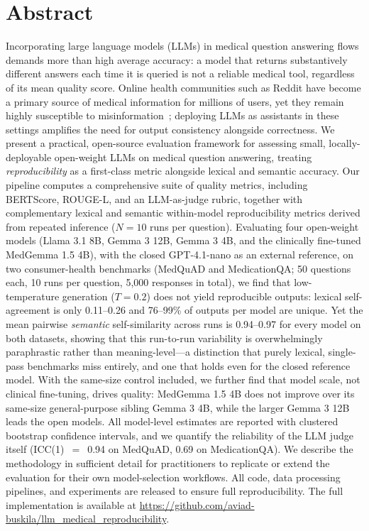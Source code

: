 \documentclass[10pt,letterpaper]{article}
\begin{document}
\section*{Abstract}
Incorporating large language models (LLMs) in medical question answering
flows demands more than high average accuracy: a model that returns
substantively different answers each time it is queried is not a reliable
medical tool, regardless of its mean quality score.
Online health communities such as Reddit have become a primary source of
medical information for millions of users, yet they remain highly
susceptible to misinformation~\cite{suarezlledo2021misinfo, sager2021reddit};
deploying LLMs as assistants in these settings amplifies the need for
output consistency alongside correctness.
We present a practical, open-source evaluation framework for
assessing small, locally-deployable open-weight LLMs on medical
question answering, treating \emph{reproducibility} as a first-class
metric alongside lexical and semantic accuracy.
Our pipeline computes a comprehensive suite of quality metrics, including BERTScore,
ROUGE-L, and an LLM-as-judge rubric, together with complementary
lexical and semantic within-model reproducibility metrics derived
from repeated inference ($N{=}10$ runs per question).
Evaluating four open-weight models (Llama 3.1 8B, Gemma 3 12B,
Gemma 3 4B, and the clinically fine-tuned MedGemma 1.5 4B), with the
closed GPT-4.1-nano as an external reference, on two consumer-health
benchmarks (MedQuAD and MedicationQA; 50 questions each, 10 runs per
question, 5{,}000 responses in total), we find that low-temperature
generation ($T{=}0.2$) does not yield reproducible outputs: lexical
self-agreement is only 0.11--0.26 and 76--99\% of outputs per model are
unique. Yet the mean pairwise \emph{semantic} self-similarity across
runs is 0.94--0.97 for every model on both datasets, showing that this
run-to-run variability is overwhelmingly paraphrastic rather than
meaning-level---a distinction that purely lexical, single-pass
benchmarks miss entirely, and one that holds even for the closed
reference model. With the same-size control included, we further find
that model scale, not clinical fine-tuning, drives quality: MedGemma
1.5 4B does not improve over its same-size general-purpose sibling
Gemma 3 4B, while the larger Gemma 3 12B leads the open models. All
model-level estimates are reported with clustered bootstrap confidence
intervals, and we quantify the reliability of the LLM judge itself
(ICC(1)~$=$~0.94 on MedQuAD, 0.69 on MedicationQA).
We describe the methodology in sufficient detail for practitioners
to replicate or extend the evaluation for their own model-selection
workflows. All code, data processing pipelines, and experiments are
released to ensure full reproducibility. The full implementation
is available at
\url{https://github.com/aviad-buskila/llm_medical_reproducibility}.
\end{document}
